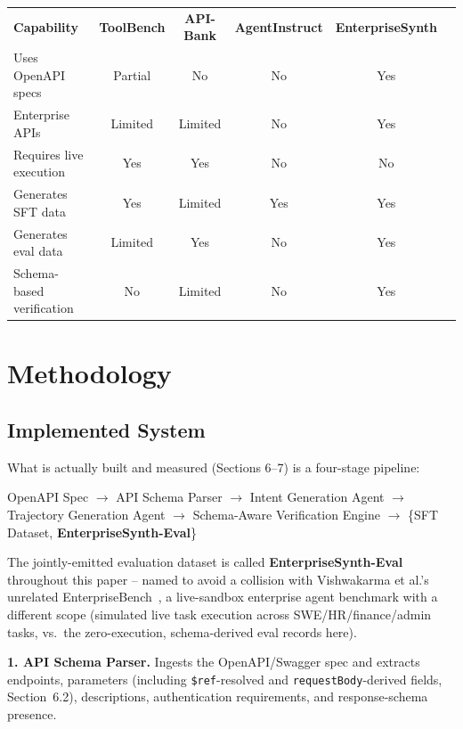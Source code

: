 \documentclass[11pt]{article}
\begin{document}
\begin{center}
\small
\begin{tabular}{lccccc}
\textbf{Capability} & \textbf{ToolBench} & \textbf{API-Bank} & \textbf{AgentInstruct} & \textbf{EnterpriseSynth} \\
Uses OpenAPI specs & Partial & No & No & Yes \\
Enterprise APIs & Limited & Limited & No & Yes \\
Requires live execution & Yes & Yes & No & No \\
Generates SFT data & Yes & Limited & Yes & Yes \\
Generates eval data & Limited & Yes & No & Yes \\
Schema-based verification & No & Limited & No & Yes \\
\end{tabular}
\end{center}

\section{Methodology}

\subsection{Implemented System}
What is actually built and measured (Sections 6--7) is a four-stage pipeline:

\begin{center}
OpenAPI Spec $\rightarrow$ API Schema Parser $\rightarrow$ Intent Generation Agent
$\rightarrow$ Trajectory Generation Agent $\rightarrow$ Schema-Aware Verification Engine
$\rightarrow$ \{SFT Dataset, \textbf{EnterpriseSynth-Eval}\}
\end{center}

The jointly-emitted evaluation dataset is called \textbf{EnterpriseSynth-Eval} throughout this
paper -- named to avoid a collision with Vishwakarma et al.'s unrelated
EnterpriseBench~\cite{vishwakarma2025enterprisebench}, a live-sandbox enterprise agent benchmark
with a different scope (simulated live task execution across SWE/HR/finance/admin tasks, vs.\ the
zero-execution, schema-derived eval records here).

\textbf{1. API Schema Parser.} Ingests the OpenAPI/Swagger spec and extracts endpoints,
parameters (including \texttt{\$ref}-resolved and \texttt{requestBody}-derived fields, Section~6.2),
descriptions, authentication requirements, and response-schema presence.
\end{document}
